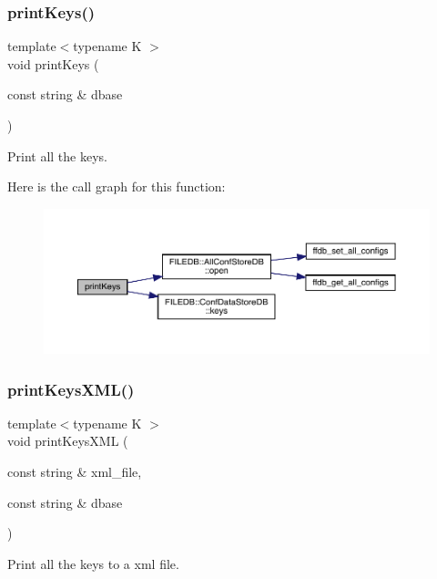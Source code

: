 \subsubsection{\texorpdfstring{printKeys()}{printKeys()}}
{\footnotesize\ttfamily template$<$typename K $>$ \\
void print\+Keys (\begin{DoxyParamCaption}\item[{const string \&}]{dbase }\end{DoxyParamCaption})}



Print all the keys. 

Here is the call graph for this function\+:
\nopagebreak
\begin{figure}[H]
\begin{center}
\leavevmode
\includegraphics[width=350pt]{d5/d55/adat-devel_2main_2dbutil_2dbutil_8cc_a05c6483ffb9fa71112b451a5dd7eb935_cgraph}
\end{center}
\end{figure}
\mbox{\label{adat-devel_2main_2dbutil_2dbutil_8cc_a44428d59560cb466420c5c0ca60315e5}} 
\subsubsection{\texorpdfstring{printKeysXML()}{printKeysXML()}}
{\footnotesize\ttfamily template$<$typename K $>$ \\
void print\+Keys\+X\+ML (\begin{DoxyParamCaption}\item[{const string \&}]{xml\+\_\+file,  }\item[{const string \&}]{dbase }\end{DoxyParamCaption})}



Print all the keys to a xml file. 

